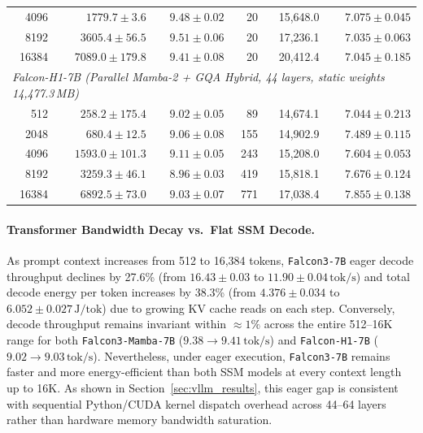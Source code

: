 \documentclass[10pt,a4paper]{article}
\begin{document}
\begin{table}[ht!]
\begin{tabular}{rrrrrr}
4096  & $1779.7 \pm 3.6$   & $9.48 \pm 0.02$ & 20 & 15,648.0 & $7.075 \pm 0.045$ \\
8192  & $3605.4 \pm 56.5$  & $9.51 \pm 0.06$ & 20 & 17,236.1 & $7.035 \pm 0.063$ \\
16384 & $7089.0 \pm 179.8$ & $9.41 \pm 0.08$ & 20 & 20,412.4 & $7.045 \pm 0.185$ \\
\midrule
\multicolumn{6}{l}{\textit{Falcon-H1-7B (Parallel Mamba-2 + GQA Hybrid, 44 layers, static weights 14,477.3\,MB)}} \\
512   & $258.2 \pm 175.4$  & $9.02 \pm 0.05$ & 89  & 14,674.1 & $7.044 \pm 0.213$ \\
2048  & $680.4 \pm 12.5$   & $9.06 \pm 0.08$ & 155 & 14,902.9 & $7.489 \pm 0.115$ \\
4096  & $1593.0 \pm 101.3$ & $9.11 \pm 0.05$ & 243 & 15,208.0 & $7.604 \pm 0.053$ \\
8192  & $3259.3 \pm 46.1$  & $8.96 \pm 0.03$ & 419 & 15,818.1 & $7.676 \pm 0.124$ \\
16384 & $6892.5 \pm 73.0$  & $9.03 \pm 0.07$ & 771 & 17,038.4 & $7.855 \pm 0.138$ \\
\bottomrule
\end{tabular}
\end{table}

\paragraph{Transformer Bandwidth Decay vs.\ Flat SSM Decode.}
As prompt context increases from 512 to 16,384 tokens, \texttt{Falcon3-7B} eager decode throughput declines by 27.6\% (from $16.43 \pm 0.03$ to $11.90 \pm 0.04\,\text{tok/s}$) and total decode energy per token increases by 38.3\% (from $4.376 \pm 0.034$ to $6.052 \pm 0.027\,\text{J/tok}$) due to growing KV cache reads on each step. Conversely, decode throughput remains invariant within $\approx 1\%$ across the entire 512--16K range for both \texttt{Falcon3-Mamba-7B} ($9.38 \to 9.41\,\text{tok/s}$) and \texttt{Falcon-H1-7B} ($9.02 \to 9.03\,\text{tok/s}$). Nevertheless, under eager execution, \texttt{Falcon3-7B} remains faster and more energy-efficient than both SSM models at every context length up to 16K. As shown in Section~\ref{sec:vllm_results}, this eager gap is consistent with sequential Python/CUDA kernel dispatch overhead across 44--64 layers rather than hardware memory bandwidth saturation.
\end{document}

